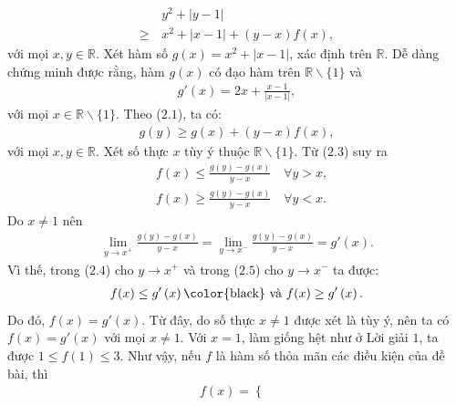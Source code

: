 \begin{multicols}{2}
	\begin{align*}
		&{y^2} + |y - 1| \\
		\ge\,& {x^2} + |x - 1| + \left( {y - x} \right)f(x), \tag{$2.1$}
	\end{align*}
	với mọi $x, y\in \mathbb{R}$.
	\vskip 0.05cm 
	Xét hàm số  $g\left( x \right) = {x^2} + |x - 1|$, xác định trên  $\mathbb{R}$.
	\vskip 0.05cm
	Dễ dàng chứng minh được rằng, hàm  $g(x)$ có đạo hàm trên $\mathbb{R} \backslash \{1\}$  và
	\begin{align*}
		g'\left( x \right) = 2x + \frac{{x - 1}}{{|x - 1|}}, \tag{$2.2$}
	\end{align*}
	với mọi  $ x \in \mathbb{R} \backslash \{1\}$.
	\vskip 0.05cm
	Theo ($2.1$), ta có:
	\begin{align*}
		g\left( y \right) \ge g\left( x \right) + \left( {y - x} \right)f(x), \tag{$2.3$}
	\end{align*}
	với mọi $x, y \in \mathbb{R}$.
	\vskip 0.05cm
	Xét số thực $x$ tùy ý thuộc  $\mathbb{R} \backslash \{1\}$.
	\vskip 0.05cm
	Từ ($2.3$) suy ra
	\begin{align*}
		&f(x) \le \frac{{g\left( y \right) - g\left( x \right)}}{{y - x}}\quad\forall y > x, \tag{$2.4$}\\
		&f(x) \ge \frac{{g\left( y \right) - g\left( x \right)}}{{y - x}}\quad\forall y < x.\tag{$2.5$}
	\end{align*}
	Do $x \ne 1$ nên
	\begin{align*}
		\mathop {\lim }\limits_{y \to {x^ + }} \!\!\frac{{g\left( y \right) \!-\! g\left( x \right)}}{{y \!-\! x}} \!=\! \mathop {\lim }\limits_{y \to {x^ - }}\!\! \frac{{g\left( y \right) \!-\! g\left( x \right)}}{{y \!-\! x}} \!=\! g'\left( x \right).
	\end{align*}
	Vì thế, trong ($2.4$) cho $y \to x^{+}$  và trong ($2.5$) cho $y \to x^-$  ta được:
	\begin{align*}
		f(x) \le g'\left( x \right) \text{\color{black} và } f(x) \ge g'\left( x \right).
	\end{align*}
	Do đó, $f(x) = g'\left( x \right)$.  Từ đây, do số thực \linebreak $x \ne 1$ được xét là tùy ý, nên ta có \linebreak $f(x) = g'\left( x \right)$  với mọi $x \ne 1$.
	\vskip 0.05cm
	Với $x = 1$, làm giống hệt như ở Lời giải $1$, ta được $1 \le f(1) \le 3$.
	\vskip 0.05cm
	Như vậy, nếu $f$  là hàm số thỏa mãn các điều kiện của đề bài, thì
	\begin{align*}
		f(x) = \begin{cases}

\end{cases}
\end{align*}
\end{multicols}

